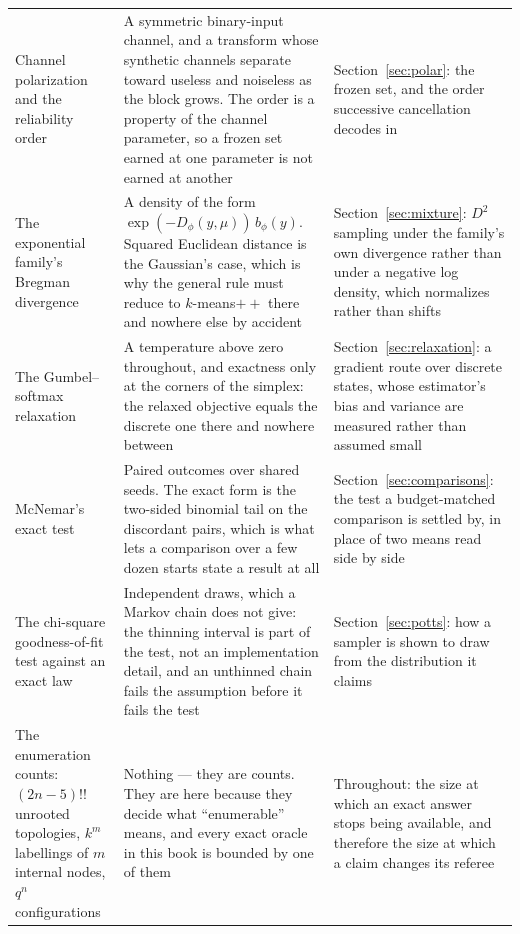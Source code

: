 \documentclass[11pt,a4paper]{article}
\begin{document}
\begin{longtable}{@{}p{}p{}p{}@{}}
  Channel polarization and the reliability order
  & A symmetric binary-input channel, and a transform whose synthetic channels
  separate toward useless and noiseless as the block grows. The order is a
  property of the channel parameter, so a frozen set earned at one parameter
  is not earned at another
  & Section~\ref{sec:polar}: the frozen set, and the order successive
  cancellation decodes in \\

  The exponential family's Bregman divergence
  & A density of the form $\exp(-D_\phi(y,\mu))\,b_\phi(y)$. Squared Euclidean
  distance is the Gaussian's case, which is why the general rule must reduce
  to $k$-means$++$ there and nowhere else by accident
  & Section~\ref{sec:mixture}: $D^2$ sampling under the family's own
  divergence rather than under a negative log density, which normalizes rather
  than shifts \\

  The Gumbel--softmax relaxation
  & A temperature above zero throughout, and exactness only at the corners of
  the simplex: the relaxed objective equals the discrete one there and
  nowhere between
  & Section~\ref{sec:relaxation}: a gradient route over discrete states, whose
  estimator's bias and variance are measured rather than assumed small \\

  McNemar's exact test
  & Paired outcomes over shared seeds. The exact form is the two-sided
  binomial tail on the discordant pairs, which is what lets a comparison over
  a few dozen starts state a result at all
  & Section~\ref{sec:comparisons}: the test a budget-matched comparison is
  settled by, in place of two means read side by side \\

  The chi-square goodness-of-fit test against an exact law
  & Independent draws, which a Markov chain does not give: the thinning
  interval is part of the test, not an implementation detail, and an
  unthinned chain fails the assumption before it fails the test
  & Section~\ref{sec:potts}: how a sampler is shown to draw from the
  distribution it claims \\

  The enumeration counts: $(2n-5)!!$ unrooted topologies, $k^{m}$ labellings
  of $m$ internal nodes, $q^{n}$ configurations
  & Nothing --- they are counts. They are here because they decide what
  ``enumerable'' means, and every exact oracle in this book is bounded by one
  of them
  & Throughout: the size at which an exact answer stops being available, and
  therefore the size at which a claim changes its referee \\
\end{longtable}
\end{document}
